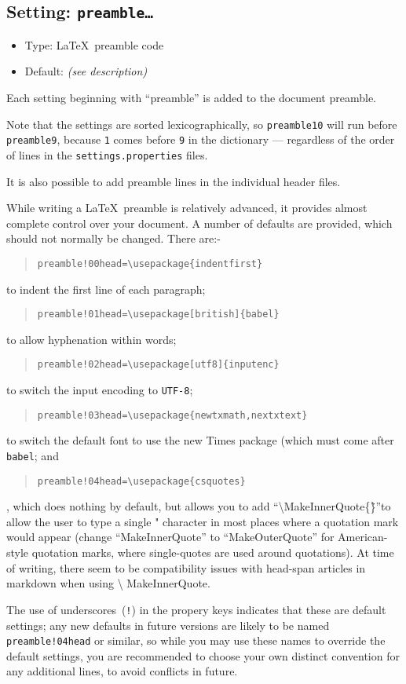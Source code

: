 \documentclass[a4paper,DIV=11]{scrartcl}
\newcommand{\property}[5]{
  \subsection{#1: \texttt{#2}}
  \begin{itemize}
  \item Type: #3
  \item Default: #4
  \end{itemize}
  #5
}
\newcommand{\setting}{\property{Setting}}
\begin{document}
\setting{preamble\dots}{\LaTeX\ preamble code}{\textit{(see description)}}{
  Each setting beginning with ``preamble'' is added to the document
  preamble.\par
  Note that the settings are sorted lexicographically, so
  \texttt{preamble10} will run before \texttt{preamble9}, because
  \texttt{1} comes before \texttt{9} in the dictionary --- regardless of the order of
  lines in the \texttt{settings.properties} files.\par
  It is also possible to add preamble lines in the individual header
  files.\par
  While writing a \LaTeX\ preamble is relatively advanced, it provides
  almost complete control over your document. A number of defaults are
  provided, which should not normally be changed. There are:-\par
  \begin{quote}
    \texttt{preamble!00head=\textbackslash usepackage\{indentfirst\}}
  \end{quote}
  to indent the first line of each paragraph;\par
  \begin{quote}
    \texttt{preamble!01head=\textbackslash usepackage[british]\{babel\}}
  \end{quote}
  to allow hyphenation within words;
  \begin{quote}
    \texttt{preamble!02head=\textbackslash usepackage[utf8]\{inputenc\}}
  \end{quote}
  to switch the input encoding to \texttt{UTF-8};\par
  \begin{quote}
    \texttt{preamble!03head=\textbackslash usepackage\{newtxmath,nextxtext\}}
  \end{quote}
  to switch the default font to use the new Times package (which must
  come after \texttt{babel}; and
  \begin{quote}
    \texttt{preamble!04head=\textbackslash usepackage\{csquotes\}}
  \end{quote}
  , which does nothing by default, but allows you to add
  ``\textbackslash MakeInnerQuote\{\"\}''to allow the user to type a
  single " character in most places where a quotation mark would
  appear (change ``MakeInnerQuote'' to ``MakeOuterQuote'' for
  American-style quotation marks, where single-quotes are used around
  quotations). At time of writing, there seem to be compatibility
  issues with head-span articles in markdown when using \textbackslash
  MakeInnerQuote.\par
  The use of underscores~(\texttt{!}) in the propery keys indicates
  that these are default settings; any new defaults in future versions
  are likely to be named \texttt{preamble!04head} or similar, so while
  you may use these names to override the default settings, you are
  recommended to choose your own distinct convention for any
  additional lines, to avoid
  conflicts in future.
}
\end{document}
